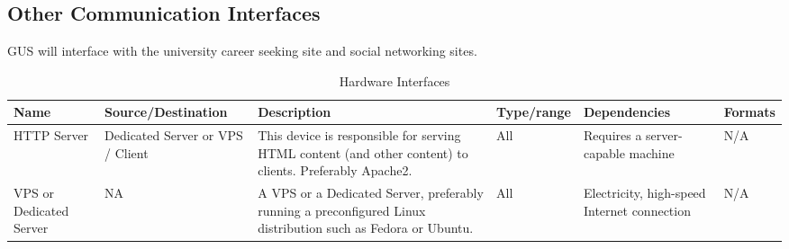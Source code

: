 \documentclass[12pt, oneside, letterpaper]{report}
\begin{document}
		\subsection{Other Communication Interfaces}
			 GUS will interface with the university career seeking site
			 and social networking sites.
			 \pagebreak
			 \begin{landscape}
		\begin{table} \caption{Hardware Interfaces}
		\begin{tabular}{|p{1.75cm}|p{4cm}|p{5.25cm}|p{2.5cm}|p{3cm}|p{1.75cm}|} \hline
			 \textbf{Name}
			 & \textbf{Source/Destination}
			 & \textbf{Description}
			 & \textbf{Type/range}
			 & \textbf{Dependencies}
			 & \textbf{Formats}
			 \\\hline
			 HTTP Server
			 & Dedicated Server or VPS / Client
			 & This device is responsible for serving HTML content (and
			   other content) to clients. Preferably Apache2.
			 & All
			 & Requires a server-capable machine
			 & N/A
			 \\\hline
			 VPS or Dedicated Server
			 & NA
			 & A VPS or a Dedicated Server, preferably running a
			   preconfigured Linux distribution such as Fedora or Ubuntu.
			 & All
			 & Electricity, high-speed Internet connection
			 & N/A
			 \\\hline


\end{tabular}
\end{table}
\end{landscape}
\end{document}
